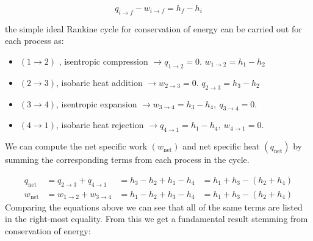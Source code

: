\documentclass{tufte-book}
\begin{document}
\begin{equation}
q_{i \rightarrow f} - w_{i \rightarrow f} = h_f - h_i
\label{eq:sfee_simple}
\end{equation} 

 the simple ideal Rankine cycle for conservation of energy can be carried out for each process as:
\begin{itemize}
\item $(1 \rightarrow 2)$ , isentropic compression $\rightarrow q_{1 \rightarrow 2} = 0$.  $w_{1 \rightarrow 2} = h_1 - h_2$
\item $(2 \rightarrow 3)$, isobaric heat addition $\rightarrow w_{2 \rightarrow 3} = 0$. $q_{2 \rightarrow 3} = h_3 - h_2$
\item $(3 \rightarrow 4)$, isentropic expansion $\rightarrow w_{3 \rightarrow 4} = h_3 - h_4, \ q_{3 \rightarrow 4}=0$.
\item $(4 \rightarrow 1)$, isobaric heat rejection $\rightarrow q_{4 \rightarrow 1} = h_1 - h_4, \ w_{4 \rightarrow 1} = 0$.
\end{itemize}

We can compute the net specific work $(w_{\text{net}})$ and net specific heat $(q_{\text{net}})$ by summing the corresponding terms from each process in the cycle.

\begin{equation*}
\begin{aligned}
q_{\text{net}} &=q_{2 \rightarrow 3}+q_{4 \rightarrow 1} &=h_3 - h_2 + h_1 - h_4 &= h_1+h_3 - (h_2+h_4)\\
w_{\text{net}} &=w_{1 \rightarrow 2}+w_{3 \rightarrow 4} &=h_1-h_2 + h_3 - h_4 &=h_1+h_3 - (h_2+h_4)
\end{aligned}
\end{equation*}
Comparing the equations above we can see that all of the same terms are listed in the right-most equality.  From this we get a fundamental result stemming from conservation of energy:
\end{document}
